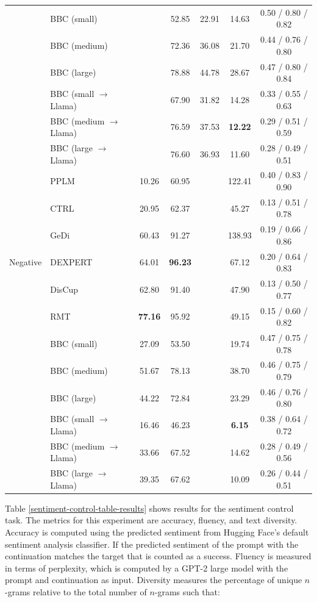 \documentclass[phd,electronic,oneside,twosidetoc,letterpaper,chaptercenter,parttop,lof]{byumsphd}
\begin{document}
\begin{table}[t]
{\begin{tabular}{llccccc}
    \cmidrule(r){2-7}
    & BBC (small) & & 52.85 & 22.91 & 14.63 & 0.50 / 0.80 / 0.82 \\
    & BBC (medium) & & 72.36 & 36.08 & 21.70 & 0.44 / 0.76 / 0.80    \\
    & BBC (large) & & 78.88 & 44.78 & 28.67 & 0.47 / 0.80 / 0.84 \\
    & BBC (small \(\rightarrow\) Llama) & & 67.90 & 31.82 & 14.28 & 0.33 / 0.55 / 0.63 \\
    & BBC (medium \(\rightarrow\) Llama) & & 76.59 & 37.53 & \textbf{12.22} & 0.29 / 0.51 / 0.59 \\
    & BBC (large \(\rightarrow\) Llama) & & 76.60 & 36.93 & 11.60 & 0.28 / 0.49 / 0.51 \\
    \midrule
    \multirow{7}{*}{Negative} & PPLM \cite{dathathri2020plug} & 10.26 
 & 60.95 & & 122.41 & 0.40 / 0.83 / 0.90 \\ 
    & CTRL \cite{keskar2019ctrl} & 20.95 & 62.37 & & 45.27 & 0.13 / 0.51 / 0.78 \\
    & GeDi \cite{krause2021gedi} & 60.43 & 91.27 & & 138.93 & 0.19 / 0.66 / 0.86 \\
    & DEXPERT \cite{liu2021dexpert} & 64.01 & \textbf{96.23} & & 67.12 & 0.20 / 0.64 / 0.83 \\
    & DisCup \cite{zhang2022discup} & 62.80 & 91.40 & & 47.90 & 0.13 / 0.50 / 0.77 \\
    & RMT \cite{zhang2023rmt} & \textbf{77.16} & 95.92 & & 49.15 & 0.15 / 0.60 / 0.82 \\
    \cmidrule(r){2-7}
    & BBC (small) & 27.09 & 53.50 &  & 19.74 & 0.47 / 0.75 / 0.78 \\
    & BBC (medium) & 51.67 & 78.13 &  & 38.70 & 0.46 / 0.75 / 0.79 \\
    & BBC (large) & 44.22 & 72.84 &  & 23.29 & 0.46 / 0.76 / 0.80 \\
    & BBC (small \(\rightarrow\) Llama) & 16.46 & 46.23 & & \textbf{6.15} & 0.38 / 0.64 / 0.72 \\
    & BBC (medium \(\rightarrow\) Llama) & 33.66 & 67.52 & & 14.62 & 0.28 / 0.49 / 0.56 \\
    & BBC (large \(\rightarrow\) Llama) & 39.35 & 67.62 & & 10.09 & 0.26 / 0.44 / 0.51 \\
    \bottomrule
  \end{tabular}
  }
\end{table}

Table \ref{sentiment-control-table-results} shows results for the sentiment control task. 
The metrics for this experiment are accuracy, fluency, and text diversity. 
Accuracy is computed using the predicted sentiment from Hugging Face's default sentiment analysis classifier. 
If the predicted sentiment of the prompt with the continuation matches the target that is counted as a success. 
Fluency is measured in terms of perplexity, which is computed by a GPT-2 large model with the prompt and continuation as input. 
Diversity measures the percentage of unique $n$-grams relative to the total number of \(n\)-grams such that:
\end{document}
